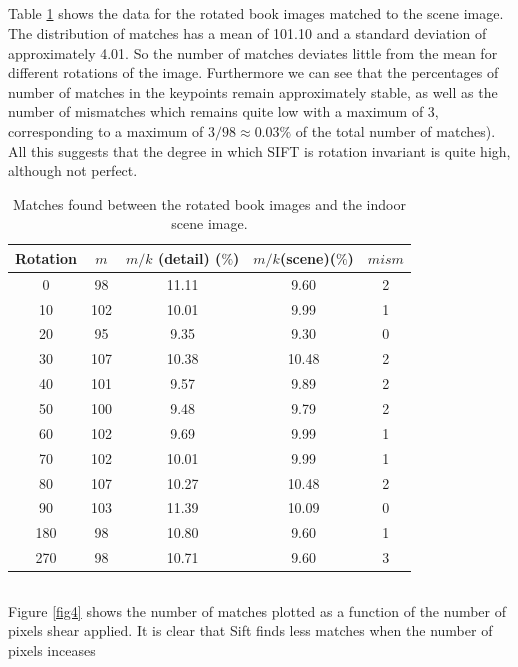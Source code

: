 \documentclass{article}
\begin{document}
\subsection{}
Table \ref{table4} shows the data for the rotated book images matched to the scene image. The distribution of matches has a mean of 101.10 and a standard deviation of approximately 4.01. So the number of matches deviates little from the mean for different rotations of the image. Furthermore we can see that the percentages of number of matches in the keypoints remain approximately stable, as well as the number of mismatches which remains quite low with a maximum of 3, corresponding to a maximum of $3/98 \approx 0.03 \% $ of the total number of matches). All this suggests that the degree in which SIFT is rotation invariant is quite high, although not perfect.

\begin{table}[H]
\centering
 \caption{Matches found between the rotated book images and the indoor scene image.}
 \label{table4}
 \begin{tabular}{|c|c|c|c|c|}
 \hline
  Rotation & $m$ & $m/k$ (detail) ($\%$) & $m/k$(scene)($\%$) & $mism$\\
  \hline
  0 & 98 & 11.11 & 9.60 & 2 \\
  10 & 102 & 10.01 & 9.99 & 1 \\
  20 & 95 & 9.35 & 9.30 & 0 \\
  30 & 107 & 10.38 & 10.48 & 2 \\
  40 & 101 & 9.57 & 9.89 & 2 \\
  50 & 100 & 9.48 & 9.79 & 2 \\
  60 & 102 & 9.69 & 9.99 & 1 \\
  70 & 102 & 10.01 & 9.99 & 1 \\
  80 & 107 & 10.27 & 10.48 & 2 \\
  90 & 103 & 11.39 & 10.09 & 0 \\
  180 & 98 & 10.80 & 9.60 & 1 \\
  270 & 98 & 10.71 & 9.60 & 3 \\
  \hline
 \end{tabular}
\end{table}

\subsection{}
Figure \ref{fig4} shows the number of matches plotted as a function of the number of pixels shear applied. It is clear that Sift finds less matches when the number of pixels inceases

\end{document}
